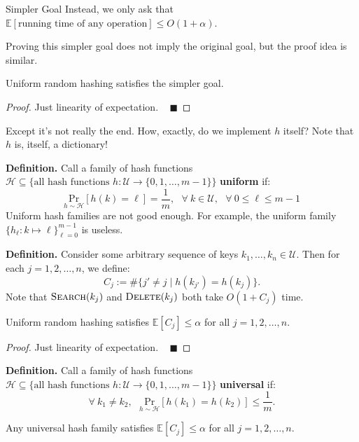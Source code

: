 \begin{problem}{Simpler Goal}
Instead, we only ask that $\mathbb{E}[\text{running time of any operation}] \leq O(1 + \alpha)$.
\end{problem}

Proving this simpler goal does not imply the original goal, but the proof idea is similar.

\begin{claim}
Uniform random hashing satisfies the simpler goal.
\end{claim}

\begin{proof}
    Just linearity of expectation. ~ $\blacksquare$
\end{proof}

Except it's not really the end.  How, exactly, do we implement $h$ itself?  Note that $h$ is, itself, a dictionary!

\textbf{Definition.} Call a family of hash functions $\mathcal{H} \subseteq \{\text{all hash functions } h: \mathcal{U} \to \{0, 1, \dots, m - 1\}\}$ \textbf{uniform} if:
\[ \underset{h \sim \mathcal{H}}{\mathrm{Pr}} [ h(k) = \ell] = \dfrac{1}{m}, ~~~ \forall \ k \in \mathcal{U}, ~~~ \forall \ 0 \leq \ell \leq m - 1 \]
Uniform hash families are not good enough.  For example, the uniform family $\{h_\ell: k \mapsto \ell \}_{\ell = 0}^{m - 1}$ is useless.

\textbf{Definition.} Consider some arbitrary sequence of keys $k_1, \dots, k_n \in \mathcal{U}$.  Then for each $j = 1, 2, \dots, n$, we define:
\[ C_j := \# \{ j' \neq j \mid h(k_{j'}) = h(k_j)\}. \]
Note that $\textsc{Search}(k_j)$ and $\textsc{Delete}(k_j)$ both take $O(1 + C_j)$ time.

\begin{claim}
Uniform random hashing satisfies $\mathbb{E}[C_j] \leq \alpha$ for all $j = 1, 2, \dots, n$.
\end{claim}

\begin{proof}
    Just linearity of expectation. ~ $\blacksquare$
\end{proof}

\textbf{Definition.} Call a family of hash functions $\mathcal{H} \subseteq \{\text{all hash functions } h: \mathcal{U} \to \{0, 1, \dots, m - 1\}\}$ \textbf{universal} if:
\[ \forall \ k_1 \neq k_2, ~~~ \underset{h \sim \mathcal{H}}{\mathrm{Pr}}[h(k_1) = h(k_2)] \leq \dfrac{1}{m}. \]
\begin{claim}
Any universal hash family satisfies $\mathbb{E}[C_j] \leq \alpha$ for all $j = 1, 2, \dots, n$.
\end{claim}

